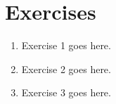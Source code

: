 
\section{Exercises}

\begin{enumerate}

\item Exercise 1 goes here.

\item Exercise 2 goes here.

\item Exercise 3 goes here.

\end{enumerate}
